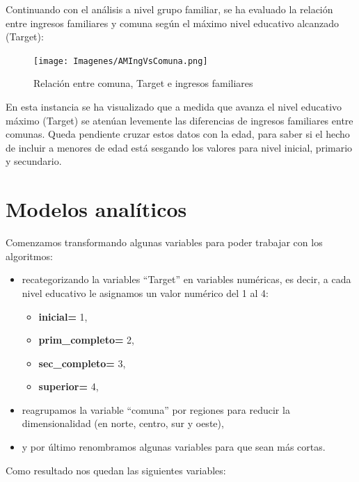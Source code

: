 \documentclass[a4paper]{article}
\begin{document}
        \newpage

        Continuando con el análisis a nivel grupo familiar, se ha evaluado la relación entre ingresos familiares y comuna según el máximo nivel educativo alcanzado (Target):
        \begin{figure}[H]
            \centering
            \texttt{[image: Imagenes/AMIngVsComuna.png]}
            \caption{Relación entre comuna, Target e ingresos familiares}
            \label{AM Location, Taget and Familiar Income}
        \end{figure}
 
        En esta instancia se ha visualizado que a medida que avanza el nivel educativo máximo (Target) se atenúan levemente las diferencias de ingresos familiares entre comunas. Queda pendiente cruzar estos datos con la edad, para saber si el hecho de incluir a menores de edad está sesgando los valores para nivel inicial, primario y secundario.
 
\newpage


\section{Modelos analíticos}

    Comenzamos transformando algunas variables para poder trabajar con los algoritmos:
    \begin{itemize}
        \item recategorizando la variables ``Target'' en variables numéricas, es decir, a cada nivel educativo le asignamos un valor numérico del 1 al 4:
        \begin{itemize}
            \item \textbf{inicial=} 1,
            \item \textbf{prim\_completo=} 2,
            \item \textbf{sec\_completo=} 3,
            \item \textbf{superior=} 4,
        \end{itemize}
        \item reagrupamos la variable ``comuna'' por regiones para reducir la dimensionalidad (en norte, centro, sur y oeste),
        \item y por último renombramos algunas variables para que sean más cortas.
    \end{itemize}

    Como resultado nos quedan las siguientes variables:
    
\end{document}
